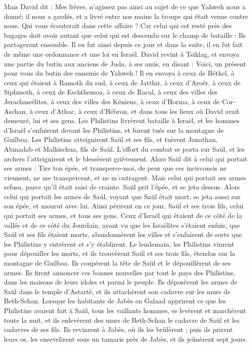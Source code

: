 \begin{multicols}{2}
Mais David dit : Mes frères, n'agissez pas ainsi au sujet de ce que Yahweh nous a donné; il nous a gardés, et a livré entre nos mains la troupe qui était venue contre nous.
Qui vous écouterait dans cette affaire ? Car celui qui est resté près des bagages doit avoir autant que celui qui est descendu sur le champ de bataille : Ils partageront ensemble.
Il en fut ainsi depuis ce jour et dans la suite, il en fut fait de même une ordonnance et une loi en Israël.
David revint à Tsiklag, et envoya une partie du butin aux anciens de Juda, à ses amis, en disant : Voici, un présent pour vous du butin des ennemis de Yahweh !
Il en envoya à ceux de Béthel, à ceux qui étaient à Ramoth du sud, à ceux de Jatthir,
à ceux d'Aroër, à ceux de Siphmoth, à ceux de Eschthemoa,
à ceux de Racal, à ceux des villes des Jerachmeélites, à ceux des villes des Kéniens,
à ceux d'Horma, à ceux de Cor-Aschan, à ceux d'Athac,
à ceux d'Hébron, et dans tous les lieux où David avait demeuré, lui et ses gens.
\VerseOne{}Les Philistins livrèrent bataille à Israël, et les hommes d'Israël s'enfuirent devant les Philistins, et furent tués sur la montagne de Guilboa.
Les Philistins atteignirent Saül et ses fils, et tuèrent Jonathan, Abinadab et Malkischua, fils de Saül.
L'effort du combat se porta sur Saül, et les archers l'atteignirent et le blessèrent grièvement.
Alors Saül dit à celui qui portait ses armes : Tire ton épée, et transperce-moi, de peur que ces incirconcis ne viennent, ne me transpercent, et ne m'outragent. Mais celui qui portait ses armes refusa, parce qu'il était saisi de crainte. Saül prit l'épée, et se jeta dessus.
Alors celui qui portait les armes de Saül, voyant que Saül était mort, se jeta aussi sur son épée, et mourut avec lui.
Ainsi périrent en ce jour, Saül et ses trois fils, celui qui portait ses armes, et tous ses gens.
Ceux d'Israël qui étaient de ce côté de la vallée et de ce côté du Jourdain, ayant vu que les Israëlites s'étaient enfuis, que Saül et ses fils étaient morts, abandonnèrent les villes et s'enfuirent de sorte que les Philistins y entrèrent et s'y établirent.
Le lendemain, les Philistins vinrent pour dépouiller les morts, et ils trouvèrent Saül et ses trois fils, étendus sur la montagne de Guilboa.
Ils coupèrent la tête de Saül et le dépouillèrent de ses armes. Ils firent annoncer ces bonnes nouvelles par tout le pays des Philistins, dans les maisons de leurs idoles et parmi le peuple.
Ils déposèrent les armes de Saül dans le temple d'Astarté, et ils attachèrent son cadavre sur les murs de Beth-Schan.
Lorsque les habitants de Jabès en Galaad apprirent ce que les Philistins avaient fait à Saül,
tous les vaillants hommes, se levèrent et marchèrent toute la nuit, et ils enlevèrent des murs de Beth-Schan le cadavre de Saül et les cadavres de ses fils. Ils revinrent à Jabès, où ils les brûlèrent ;
puis ils prirent leurs os, les ensevelirent sous un tamaris près de Jabès, et ils jeûnèrent sept jours.
\PPE{}
\end{multicols}

